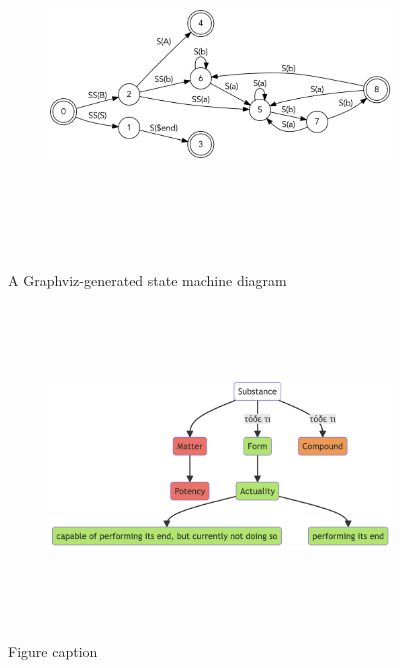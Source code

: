 \documentclass[
  12pt,
  a4paper,
  oneside,
  numbers=noenddot,
  titlepage,
  toclink=all,
  toc=bibliography]{scrbook}
\theoremstyle{definition}
\theoremstyle{definition}
\theoremstyle{definition}
\theoremstyle{plain}
\theoremstyle{plain}
\theoremstyle{plain}
\theoremstyle{plain}
\theoremstyle{plain}
\theoremstyle{remark}
\begin{document}
\begin{figure}

{\centering 

\begin{figure}[H]

{\centering \includegraphics[width=5.5in,height=3.5in]{index_files/figure-latex/dot-figure-2.png}

}

\end{figure}

}

\caption{\label{fig-scriv15}A Graphviz-generated state machine diagram}

\end{figure}

\begin{figure}

{\centering 

\begin{figure}[H]

{\centering \includegraphics[width=6.65in,height=3.32in]{index_files/figure-latex/mermaid-figure-1.png}

}

\end{figure}

}

\caption{\label{fig-scriv16}Figure caption}

\end{figure}
\end{document}
